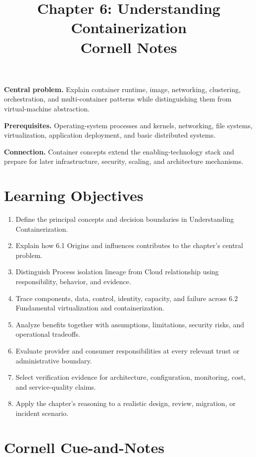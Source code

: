 \documentclass[11pt]{article}
\title{Chapter 6: Understanding Containerization\\[2mm]\large Cornell Notes}
\author{}
\date{}
\begin{document}
\maketitle
\thispagestyle{fancy}
\vspace{-1.5em}
\begin{orientationbox}
\textbf{Central problem.} Explain container runtime, image, networking, clustering, orchestration, and multi-container patterns while distinguishing them from virtual-machine abstraction.\par\smallskip
\textbf{Prerequisites.} Operating-system processes and kernels, networking, file systems, virtualization, application deployment, and basic distributed systems.\par\smallskip
\textbf{Connection.} Container concepts extend the enabling-technology stack and prepare for later infrastructure, security, scaling, and architecture mechanisms.
\end{orientationbox}
\section{Learning Objectives}
\begin{enumerate}
\item Define the principal concepts and decision boundaries in Understanding Containerization.
\item Explain how 6.1 Origins and influences contributes to the chapter's central problem.
\item Distinguish Process isolation lineage from Cloud relationship using responsibility, behavior, and evidence.
\item Trace components, data, control, identity, capacity, and failure across 6.2 Fundamental virtualization and containerization.
\item Analyze benefits together with assumptions, limitations, security risks, and operational tradeoffs.
\item Evaluate provider and consumer responsibilities at every relevant trust or administrative boundary.
\item Select verification evidence for architecture, configuration, monitoring, cost, and service-quality claims.
\item Apply the chapter's reasoning to a realistic design, review, migration, or incident scenario.
\end{enumerate}
\section{Cornell Cue-and-Notes}
\end{document}
